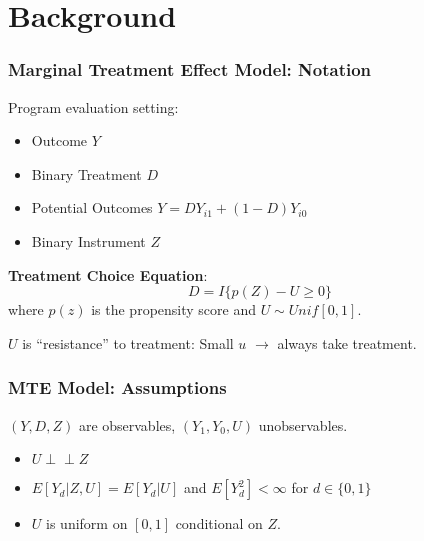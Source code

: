 \documentclass[11pt, aspectratio=169]{beamer}
\newcommand{\indep}{\perp\!\!\!\!\perp}
\begin{document}
\begin{frame}
    \tableofcontents
\end{frame}

\section{Background}

\begin{frame}
    \frametitle{Marginal Treatment Effect Model: Notation}

    Program evaluation setting:
    \begin{itemize}
        \item Outcome $Y$
        \item Binary Treatment $D$
        \item Potential Outcomes $Y = D Y_{i1} + (1-D) Y_{i0}$
        \item Binary Instrument $Z$
    \end{itemize}

    \vspace{0.5cm}

    \textbf{Treatment Choice Equation}:
    \begin{equation}
        D = I\{p(Z) - U \geq 0\}
    \end{equation}
    where $p(z)$ is the propensity score and $U\sim Unif[0,1]$.

    \vspace{0.5cm}

    $U$ is ``resistance'' to treatment: Small $u$ $\rightarrow$ always take treatment.

\end{frame}

\begin{frame}
    \frametitle{MTE Model: Assumptions}
    $(Y,D,Z)$ are observables, $(Y_1, Y_0, U)$ unobservables.


    \begin{itemize}
        \item $U \indep Z$
        \item $E[Y_d|Z,U] = E[Y_d|U]$ and $E[Y_d^2] < \infty$ for $d \in \{0,1\}$
        \item $U$ is uniform on $[0,1]$ conditional on $Z$.
    \end{itemize}

\end{frame}
\end{document}
